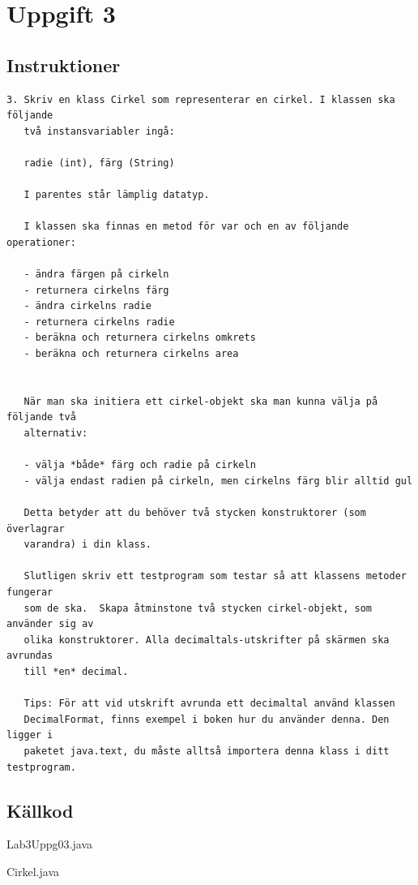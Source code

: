 \section{Uppgift 3}\label{sec:uppg03}

\subsection{Instruktioner}
\begin{verbatim}
3. Skriv en klass Cirkel som representerar en cirkel. I klassen ska följande
   två instansvariabler ingå:

   radie (int), färg (String)

   I parentes står lämplig datatyp.

   I klassen ska finnas en metod för var och en av följande operationer:

   - ändra färgen på cirkeln
   - returnera cirkelns färg
   - ändra cirkelns radie
   - returnera cirkelns radie
   - beräkna och returnera cirkelns omkrets
   - beräkna och returnera cirkelns area


   När man ska initiera ett cirkel-objekt ska man kunna välja på följande två
   alternativ:

   - välja *både* färg och radie på cirkeln
   - välja endast radien på cirkeln, men cirkelns färg blir alltid gul

   Detta betyder att du behöver två stycken konstruktorer (som överlagrar
   varandra) i din klass.

   Slutligen skriv ett testprogram som testar så att klassens metoder fungerar
   som de ska.  Skapa åtminstone två stycken cirkel-objekt, som använder sig av
   olika konstruktorer. Alla decimaltals-utskrifter på skärmen ska avrundas
   till *en* decimal.

   Tips: För att vid utskrift avrunda ett decimaltal använd klassen
   DecimalFormat, finns exempel i boken hur du använder denna. Den ligger i
   paketet java.text, du måste alltså importera denna klass i ditt testprogram.
\end{verbatim}


\subsection{Källkod}
\caption{Lab3Uppg03.java}
\label{src:uppg03}

\caption{Cirkel.java}
\label{src:cirkel}


